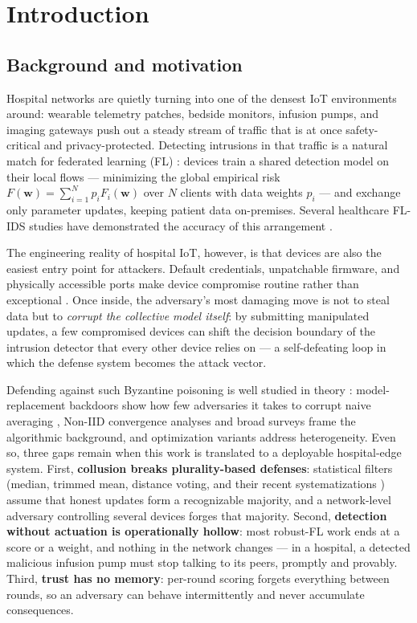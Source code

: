 \documentclass[cmc,article,submit,moreauthors,pdftex]{Definitions/tsp}
\begin{document}
\section{Introduction}\label{sec:introduction}

\subsection{Background and motivation}\label{sec:background-and-motivation}

Hospital networks are quietly turning into one of the densest IoT environments around: wearable telemetry patches, bedside monitors, infusion pumps, and imaging gateways push out a steady stream of traffic that is at once safety-critical and privacy-protected. Detecting intrusions in that traffic is a natural match for federated learning (FL) \cite{ref-1,ref-2,ref-3}: devices train a shared detection model on their local flows --- minimizing the global empirical risk $F(\mathbf{w}) = \sum_{i=1}^{N} p_i F_i(\mathbf{w})$ over $N$ clients with data weights $p_i$ --- and exchange only parameter updates, keeping patient data on-premises. Several healthcare FL-IDS studies have demonstrated the accuracy of this arrangement \cite{ref-2,ref-4,ref-7,ref-8,ref-9,ref-10,ref-11,ref-12}.

The engineering reality of hospital IoT, however, is that devices are also the easiest entry point for attackers. Default credentials, unpatchable firmware, and physically accessible ports make device compromise routine rather than exceptional \cite{ref-13}. Once inside, the adversary's most damaging move is not to steal data but to \emph{corrupt the collective model itself}: by submitting manipulated updates, a few compromised devices can shift the decision boundary of the intrusion detector that every other device relies on --- a self-defeating loop in which the defense system becomes the attack vector.

Defending against such Byzantine poisoning is well studied in theory \cite{ref-14,ref-15,ref-16}: model-replacement backdoors show how few adversaries it takes to corrupt naive averaging \cite{ref-17}, Non-IID convergence analyses \cite{ref-18} and broad surveys \cite{ref-19} frame the algorithmic background, and optimization variants \cite{ref-20,ref-21} address heterogeneity. Even so, three gaps remain when this work is translated to a deployable hospital-edge system. First, \textbf{collusion breaks plurality-based defenses}: statistical filters (median, trimmed mean, distance voting, and their recent systematizations \cite{ref-22}) assume that honest updates form a recognizable majority, and a network-level adversary controlling several devices forges that majority. Second, \textbf{detection without actuation is operationally hollow}: most robust-FL work ends at a score or a weight, and nothing in the network changes --- in a hospital, a detected malicious infusion pump must stop talking to its peers, promptly and provably. Third, \textbf{trust has no memory}: per-round scoring \cite{ref-23} forgets everything between rounds, so an adversary can behave intermittently and never accumulate consequences.
\end{document}
